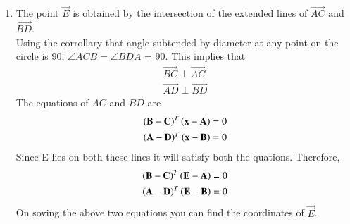 \begin{enumerate}[label=\thesection.\arabic*.,ref=\thesection.\theenumi]
\item The point $\vec{E}$ is obtained by the intersection of the extended lines of $\vec{AC}$ and $\vec{BD}$. \\
Using the corrollary that angle subtended by diameter at any point on the circle is 90\degree ; $\angle ACB = \angle BDA$ = 90\degree. This implies that \\
\begin{align} 
\vec{BC} \perp \vec{AC} \\
\vec{AD} \perp \vec{BD}
\end{align}
The equations of $AC$ and $BD$ are 
%
\begin{align}
\left(\mathbf{B}-\mathbf{C}\right)^T\left(\mathbf{x}-\mathbf{A}\right) &= 0  
\\
\left(\mathbf{A}-\mathbf{D}\right)^T\left(\mathbf{x}-\mathbf{B}\right) &= 0  
\end{align}
Since E lies on both these lines it will satisfy both the quations. Therefore,
\begin{align}
\left(\mathbf{B}-\mathbf{C}\right)^T\left(\mathbf{E}-\mathbf{A}\right) &= 0  
\\
\left(\mathbf{A}-\mathbf{D}\right)^T\left(\mathbf{E}-\mathbf{B}\right) &= 0  
\end{align}
On soving the above two equations you can find the coordinates of $\vec{E}$.



\end{enumerate}

